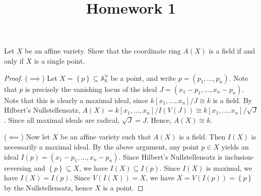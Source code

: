 \documentclass[11pt, letterpaper]{article}
\title{Homework 1}
\begin{document}
\makeproblem

\begin{problem}\label{prob:1}
	Let $X$ be an affine variety. Show that the coordinate ring $A(X)$ is a field if and only if $X$ is a single point.
\end{problem}
\begin{proof}
	($\implies $) Let $X=\left\{ p \right\} \subseteq \mathbb{A}_k^n$ be a point, and write $p=(p_1, \ldots , p_n)$. Note that $p$ is precisely the vanishing locus of the ideal $J = (x_1 - p_1, \ldots , x_n - p_n)$. Note that this is clearly a maximal ideal, since $k[x_1, \ldots , x_n] / J \cong k$ is a field. By Hilbert's Nullstellensatz, $A(X) = k[x_1, \ldots , x_n] / I(V(J)) \cong k[x_1, \ldots , x_n] / \sqrt{J} $. Since all maximal ideals are radical, $\sqrt{J} =J$. Hence, $A(X) \cong k$.

	($\impliedby $) Now let $X$ be an affine variety such that $A(X)$ is a field. Then $I(X)$ is necessarily a maximal ideal. By the above argument, any point $p\in X$ yields an ideal $I(p) = (x_1 - p_1, \ldots , x_n - p_n)$. Since Hilbert's Nullstellensatz is inclusion-reversing and $\left\{ p \right\} \subseteq X$, we have $I(X) \subseteq I(p)$. Since $I(X)$ is maximal, we have $I(X) = I(p)$. Since $V(I(X)) = X$, we have $X = V(I(p)) = \left\{ p \right\} $ by the Nullstellensatz, hence $X$ is a point.
\end{proof}
\end{document}
